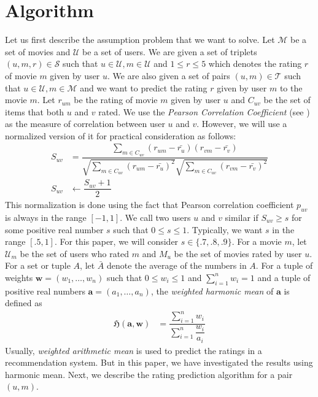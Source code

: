 \documentclass{article}
\begin{document}
	\section{Algorithm}
	Let us first describe the assumption problem that we want to solve. Let $\mathcal{M}$ be a set of movies and $\mathcal{U}$ be a set of users. We are given a set of triplets $(u,m,r)\in\mathcal{S}$ such that $u\in\mathcal{U},m\in\mathcal{U}$ and $1\leq r\leq 5$ which denotes the rating $r$ of movie $m$ given by user $u$. We are also given a set of pairs $(u,m)\in\mathcal{T}$ such that $u\in\mathcal{U},m\in\mathcal{M}$ and we want to predict the rating $r$ given by user $m$ to the movie $m$. Let $r_{um}$ be the rating of movie $m$ given by user $u$ and $C_{uv}$ be the set of items that both $u$ and $v$ rated. We use the \textit{Pearson Correlation Coefficient} (see \textcite{freedman2007statistics}) as the measure of correlation between user $u$ and $v$. However, we will use a normalized version of it for practical consideration as follows:
		\begin{align*}
			S_{uv}
				& = \dfrac{\sum_{m\in C_{uv}}(r_{um}-\bar{r_{u}})(r_{vm}-\bar{r_{v}})}{\sqrt{\sum_{m\in C_{uv}}(r_{um}-\bar{r_{u}})^{2}}\sqrt{\sum_{m\in C_{uv}}(r_{vm}-\bar{r_{v}})^{2}}}\\
			S_{uv}
				& \leftarrow \dfrac{S_{uv}+1}{2}
		\end{align*}
	This normalization is done using the fact that Pearson correlation coefficient $p_{uv}$ is always in the range $[-1,1]$. We call two users $u$ and $v$ similar if $S_{uv}\geq s$ for some positive real number $s$ such that $0\leq s\leq 1$. Typically, we want $s$ in the range $[.5, 1]$. For this paper, we will consider $s\in\{.7,.8,.9\}$. For a movie $m$, let $\mathcal{U}_{m}$ be the set of users who rated $m$ and $M_{u}$ be the set of movies rated by user $u$. For a set or tuple $A$, let $\bar{A}$ denote the average of the numbers in $A$. For a tuple of weights $\mathbf{w}=(w_{1},\ldots,w_{n})$ such that $0\leq w_{i}\leq 1$ and $\sum_{i=1}^{n}w_{i}=1$ and a tuple of positive real numbers $\mathbf{a}=(a_{1},\ldots,a_{n})$, the \textit{weighted harmonic mean} of $\mathbf{a}$ is defined as
		\begin{align*}
			\mathfrak{H}(\mathbf{a},\mathbf{w})
				& = \dfrac{\sum_{i=1}^{n}w_{i}}{\sum_{i=1}^{n}\dfrac{w_{i}}{a_{i}}}
		\end{align*}
	Usually, \textit{weighted arithmetic mean} is used to predict the ratings in a recommendation system. But in this paper, we have investigated the results using harmonic mean. Next, we describe the rating prediction algorithm for a pair $(u,m)$.
\end{document}
